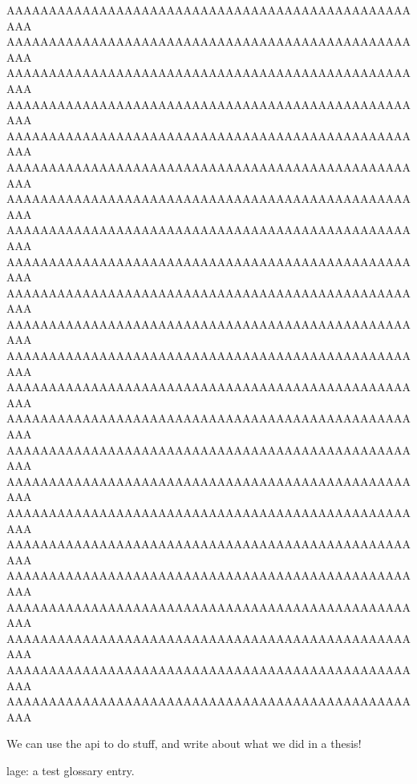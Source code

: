 \documentclass[final,11pt,baselinegrid]{../../uit-thesis}
\begin{document}
AAAAAAAAAAAAAAAAAAAAAAAAAAAAAAAAAAAAAAAAAAAAAAAAAAA\newline
%
AAAAAAAAAAAAAAAAAAAAAAAAAAAAAAAAAAAAAAAAAAAAAAAAAAA\newline
AAAAAAAAAAAAAAAAAAAAAAAAAAAAAAAAAAAAAAAAAAAAAAAAAAA\newline
AAAAAAAAAAAAAAAAAAAAAAAAAAAAAAAAAAAAAAAAAAAAAAAAAAA\newline
AAAAAAAAAAAAAAAAAAAAAAAAAAAAAAAAAAAAAAAAAAAAAAAAAAA\newline
AAAAAAAAAAAAAAAAAAAAAAAAAAAAAAAAAAAAAAAAAAAAAAAAAAA\newline
AAAAAAAAAAAAAAAAAAAAAAAAAAAAAAAAAAAAAAAAAAAAAAAAAAA\newline
AAAAAAAAAAAAAAAAAAAAAAAAAAAAAAAAAAAAAAAAAAAAAAAAAAA\newline
AAAAAAAAAAAAAAAAAAAAAAAAAAAAAAAAAAAAAAAAAAAAAAAAAAA\newline
AAAAAAAAAAAAAAAAAAAAAAAAAAAAAAAAAAAAAAAAAAAAAAAAAAA\newline
AAAAAAAAAAAAAAAAAAAAAAAAAAAAAAAAAAAAAAAAAAAAAAAAAAA\newline
AAAAAAAAAAAAAAAAAAAAAAAAAAAAAAAAAAAAAAAAAAAAAAAAAAA\newline
AAAAAAAAAAAAAAAAAAAAAAAAAAAAAAAAAAAAAAAAAAAAAAAAAAA\newline
AAAAAAAAAAAAAAAAAAAAAAAAAAAAAAAAAAAAAAAAAAAAAAAAAAA\newline
AAAAAAAAAAAAAAAAAAAAAAAAAAAAAAAAAAAAAAAAAAAAAAAAAAA\newline
AAAAAAAAAAAAAAAAAAAAAAAAAAAAAAAAAAAAAAAAAAAAAAAAAAA\newline
AAAAAAAAAAAAAAAAAAAAAAAAAAAAAAAAAAAAAAAAAAAAAAAAAAA\newline
AAAAAAAAAAAAAAAAAAAAAAAAAAAAAAAAAAAAAAAAAAAAAAAAAAA\newline
AAAAAAAAAAAAAAAAAAAAAAAAAAAAAAAAAAAAAAAAAAAAAAAAAAA\newline
AAAAAAAAAAAAAAAAAAAAAAAAAAAAAAAAAAAAAAAAAAAAAAAAAAA\newline
AAAAAAAAAAAAAAAAAAAAAAAAAAAAAAAAAAAAAAAAAAAAAAAAAAA\newline
AAAAAAAAAAAAAAAAAAAAAAAAAAAAAAAAAAAAAAAAAAAAAAAAAAA\newline
AAAAAAAAAAAAAAAAAAAAAAAAAAAAAAAAAAAAAAAAAAAAAAAAAAA\newline
\lipsum[1]
\lipsum[1]
\lipsum[1-7]



We can use the \ac{api} to do stuff, and write about what we did in a \gls{thesis}!

\Gls{lage}: a test glossary entry.
\end{document}

